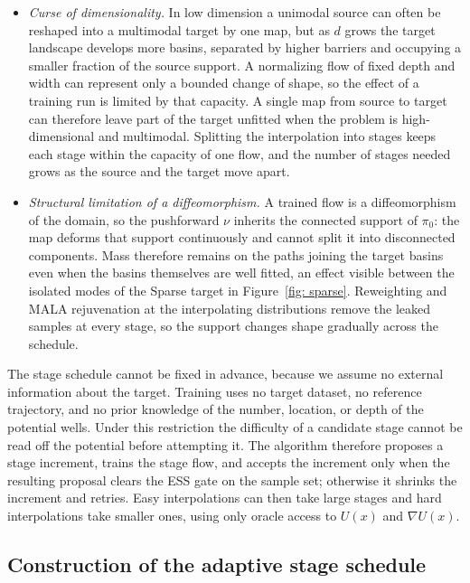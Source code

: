 \documentclass{article}
\begin{document}
\begin{itemize}
    \item \emph{Curse of dimensionality.} In low dimension a unimodal source can often be reshaped into a multimodal target by one map, but as $d$ grows the target landscape develops more basins, separated by higher barriers and occupying a smaller fraction of the source support. A normalizing flow of fixed depth and width can represent only a bounded change of shape, so the effect of a training run is limited by that capacity. A single map from source to target can therefore leave part of the target unfitted when the problem is high-dimensional and multimodal. Splitting the interpolation into stages keeps each stage within the capacity of one flow, and the number of stages needed grows as the source and the target move apart.

    \item \emph{Structural limitation of a diffeomorphism.} A trained flow is a diffeomorphism of the domain, so the pushforward $\nu$ inherits the connected support of $\pi_0$: the map deforms that support continuously and cannot split it into disconnected components. Mass therefore remains on the paths joining the target basins even when the basins themselves are well fitted, an effect visible between the isolated modes of the Sparse target in Figure~\ref{fig: sparse}. Reweighting and MALA rejuvenation at the interpolating distributions remove the leaked samples at every stage, so the support changes shape gradually across the schedule.
\end{itemize}

The stage schedule cannot be fixed in advance, because we assume no external information about the target. Training uses no target dataset, no reference trajectory, and no prior knowledge of the number, location, or depth of the potential wells. Under this restriction the difficulty of a candidate stage cannot be read off the potential before attempting it. The algorithm therefore proposes a stage increment, trains the stage flow, and accepts the increment only when the resulting proposal clears the ESS gate on the sample set; otherwise it shrinks the increment and retries. Easy interpolations can then take large stages and hard interpolations take smaller ones, using only oracle access to $U(x)$ and $\nabla U(x)$.

\subsection{Construction of the adaptive stage schedule}
\end{document}
